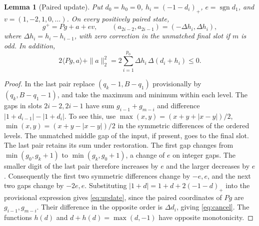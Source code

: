 \documentclass[11pt,reqno]{amsart}
\newtheorem{lemma}[theorem]{Lemma}
\theoremstyle{definition}
\newcommand{\sgn}{\operatorname{sgn}}
\begin{document}
\begin{lemma}[Paired update]\label{lem:update}
Put \(d_0=h_0=0\), \(h_i=(-1-d_i)_+\), \(e=\sgn d_1\), and \(v=(1,-2,1,0,\ldots)\). On every positively paired state,
\begin{equation}\label{eq:update}
 g^+=Pg+a+ev,\qquad (a_{2i-2},a_{2i-1})=(-\Delta h_i,\Delta h_i),
\end{equation}
where \(\Delta h_i=h_i-h_{i-1}\), with zero correction in the unmatched final slot if \(m\) is odd. In addition,
\begin{equation}\label{eq:cancel}
 2\langle Pg,a\rangle+\|a\|_2^2
 =2\sum_{i=1}^{p_0}\Delta h_i\,\Delta(d_i+h_i)\le0.
\end{equation}
\end{lemma}
\begin{proof}
In the last pair replace \((q_k-1,B-q_1)\) provisionally by \((q_k,B-q_1-1)\), and take the maximum and minimum within each level. The gaps in slots \(2i-2,2i-1\) have sum \(g_{i-1}+g_{m-i}\) and difference \(|1+d_{i-1}|-|1+d_i|\). To see this, use \(\max(x,y)=(x+y+|x-y|)/2\), \(\min(x,y)=(x+y-|x-y|)/2\) in the symmetric differences of the ordered levels. The unmatched middle gap of the input, if present, goes to the final slot. The last pair retains its sum under restoration. The first gap changes from \(\min(g_0,g_k+1)\) to \(\min(g_k,g_0+1)\), a change of \(e\) on integer gaps. The smaller digit of the last pair therefore increases by \(e\) and the larger decreases by \(e\). Consequently the first two symmetric differences change by \(-e,e\), and the next two gaps change by \(-2e,e\). Substituting \(|1+d|=1+d+2(-1-d)_+\) into the provisional expression gives \eqref{eq:update}, since the paired coordinates of \(Pg\) are \(g_{i-1},g_{m-i}\). Their difference in the opposite order is \(\Delta d_i\), giving \eqref{eq:cancel}. The functions \(h(d)\) and \(d+h(d)=\max(d,-1)\) have opposite monotonicity.
\end{proof}
\end{document}
